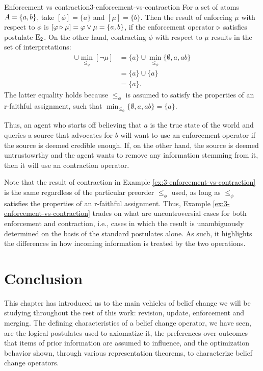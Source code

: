 \begin{xmpl}{Enforcement vs contraction}{3-enforcement-vs-contraction}
	For a set of atoms $A=\{a,b\}$, 
	take $[\phi] = \{a\}$ and $[\mu]=\{b\}$. 
	Then the result of enforcing $\mu$
	with respect to $\phi$ is $[\varphi\triangleright\mu]=\varphi\lor\mu=\{a,b\}$,
	if the enforcement operator $\triangleright$ satisfies postulate $\mathrm{E}_{2}$.
	On the other hand, contracting $\phi$ with respect to $\mu$ results 
	in the set of interpretations: 
	\begin{align*}
		[\phi]\cup\min_{\le_{\phi}}[\lnot\mu] &= \{a\}\cup\min_{\le_{\phi}}\{\emptyset,a,ab\}\\ 
											  &= \{a\}\cup\{a\}\\ 
											  & = \{a\}.
	\end{align*}
	The latter equality holds because $\le_{\phi}$ is assumed to satisfy the properties 
	of an r-faithful assignment, such that $\min_{\le_{\phi}}\{\emptyset,a,ab\} = \{a\}$.

	Thus, an agent who starts off believing that $a$ is the true state of the world 
	and queries a source that advocates for $b$
	will want to use an enforcement operator if the source is deemed credible enough.
	If, on the other hand, the source is deemed untrustowrthy and the agent wants to remove 
	any information stemming from it, then it will use an contraction operator.
\end{xmpl}

Note that the result of contraction
in Example \ref{ex:3-enforcement-vs-contraction} is the same 
regardless of the particular preorder $\le_{\phi}$ used,
as long as $\le_{\phi}$ satisfies the properties of an r-faithful assignment.
Thus, Example \ref{ex:3-enforcement-vs-contraction} trades on what are uncontroversial 
cases for both enforcement and contraction, i.e., cases in which the result 
is unambiguously determined on the basis of the standard postulates alone.
As such, it highlights the differences in how incoming information is treated 
by the two operations.







\section{Conclusion}\label{sec:3-conclusion} 
This chapter has introduced us 
to the main vehicles of belief change
we will be studying throughout the rest of this work:
revision, update, enforcement and merging.
The defining characteristics of a belief change operator,
we have seen, are the logical postulates used to axiomatize it,
the preferences over outcomes that items of prior information 
are assumed to influence,
and the optimization behavior shown,
through various representation theorems,
to characterize belief change operators.

